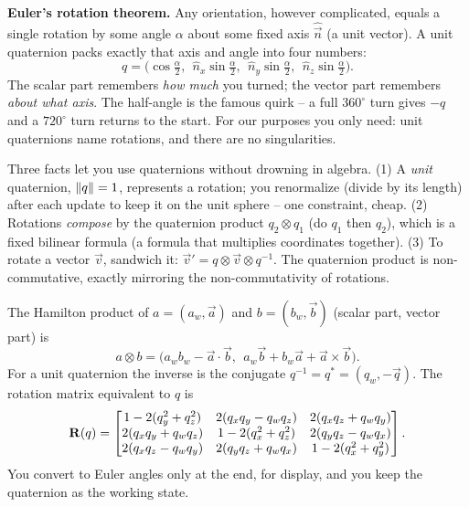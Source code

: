 \begin{intuitionbox}
\textbf{Euler's rotation theorem.} Any orientation, however complicated, equals a single
rotation by some angle $\alpha$ about some fixed axis $\hat{\vec n}$ (a unit vector).
A unit quaternion packs exactly that axis and angle into four numbers:
\[
  q = \Big(\cos\tfrac{\alpha}{2},\ \ \hat n_x \sin\tfrac{\alpha}{2},\ \
            \hat n_y \sin\tfrac{\alpha}{2},\ \ \hat n_z \sin\tfrac{\alpha}{2}\Big).
\]
The scalar part remembers \emph{how much} you turned; the vector part remembers
\emph{about what axis}. The half-angle is the famous quirk -- a full $360^\circ$ turn
gives $-q$ and a $720^\circ$ turn returns to the start. For our purposes you only need:
unit quaternions name rotations, and there are no singularities.
\end{intuitionbox}

Three facts let you use quaternions without drowning in algebra. (1) A \emph{unit}
quaternion, $\lVert q\rVert = 1$, represents a rotation; you renormalize (divide by its length) after each update to
keep it on the unit sphere -- one constraint, cheap. (2) Rotations \emph{compose} by
the quaternion product $q_2 \otimes q_1$ (do $q_1$ then $q_2$), which is a fixed
bilinear formula (a formula that multiplies coordinates together). (3) To rotate a vector $\vec v$, sandwich it:
$\vec v' = q \otimes \vec v \otimes q^{-1}$. The quaternion product is non-commutative,
exactly mirroring the non-commutativity of rotations.

\begin{formalbox}
The Hamilton product of $a=(a_w,\vec a)$ and $b=(b_w,\vec b)$ (scalar part, vector part) is
\[
  a\otimes b = \big(a_w b_w - \vec a\cdot\vec b,\ \ a_w \vec b + b_w \vec a + \vec a\times\vec b\big).
\]
For a unit quaternion the inverse is the conjugate $q^{-1}=q^{*}=(q_w,-\vec q)$. The
rotation matrix equivalent to $q$ is
\[
  \mathbf{R}(q)=\begin{bmatrix}
  1-2(q_y^2+q_z^2) & 2(q_xq_y-q_wq_z) & 2(q_xq_z+q_wq_y)\\
  2(q_xq_y+q_wq_z) & 1-2(q_x^2+q_z^2) & 2(q_yq_z-q_wq_x)\\
  2(q_xq_z-q_wq_y) & 2(q_yq_z+q_wq_x) & 1-2(q_x^2+q_y^2)
  \end{bmatrix}.
\]
You convert to Euler angles only at the end, for display, and you keep the
quaternion as the working state.
\end{formalbox}

